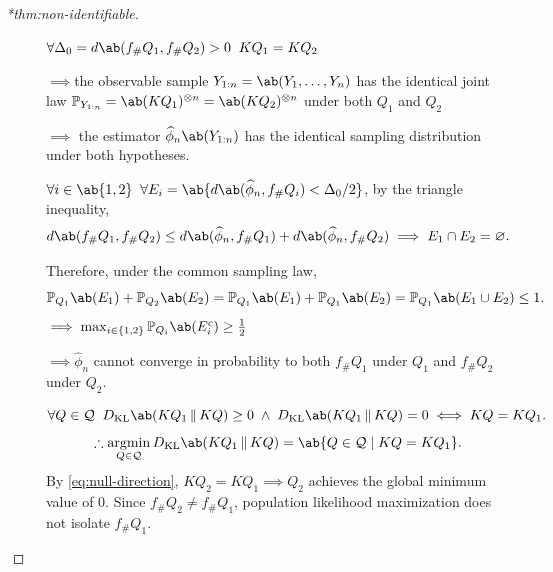 \documentclass[12pt]{article}
\newcommand{\Prb}{\mathbb{P}}
\newcommand{\KL}{D_{\mathrm{KL}}}
\newcommand{\1}{\mathbbm{1}}
\newcommand{\pushf}[1]{#1_{\#}}
\renewcommand{\[}{\begin{equation}}
\renewcommand{\]}{\end{equation}}
\begin{document}
\begin{proof}[*thm:non-identifiable]
        \begin{description}
            \item[] \(\forall \Delta_0 = d \ab( \pushf fQ_1, \pushf fQ_2 ) > 0 \;\; KQ_1 = KQ_2\)
            
            \(\implies\)the observable sample \(Y_{1:n} = \ab(Y_1, \ldots, Y_n)\) has the identical joint law \(\Prb_{Y_{1:n}} = \ab( KQ_1 )^{\otimes n} = \ab( KQ_2 )^{\otimes n}\) under both \(Q_1\) and \(Q_2\)
            
            \(\implies\) the estimator \(\widehat\phi_n \ab(Y_{1:n})\) has the identical sampling distribution under both hypotheses.
                
                \(\forall i \in \ab\{1,2\}\;\; \forall E_i = \ab\{ d \ab( \widehat\phi_n, \pushf fQ_i) < \Delta_0/2 \}\), by the triangle inequality, \[d \ab(\pushf fQ_1, \pushf fQ_2) \le d \ab( \widehat\phi_n, \pushf fQ_1) + d \ab(\widehat\phi_n, \pushf fQ_2) \implies E_1 \cap E_2 = \varnothing.\]
                
                Therefore, under the common sampling law,
                \[
                    \Prb_{Q_1}\ab(E_1) + \Prb_{Q_2}\ab(E_2) = \Prb_{Q_1}\ab(E_1) + \Prb_{Q_1}\ab(E_2) = \Prb_{Q_1}\ab(E_1 \cup E_2) \le 1.
                \]
                \(\implies \max_{i\in\{1,2\}} \Prb_{Q_i} \ab(E_i^c) \ge \frac12\)
                
                \(\implies\widehat\phi_n\) cannot converge in probability to both \(\pushf fQ_1\) under \(Q_1\) and \(\pushf fQ_2\) under \(Q_2\).
            \item[]
                \[
                    \forall Q \in \mathcal{Q}\;\;\KL \ab(KQ_1 \,\|\, KQ) \ge 0\;\land \;\KL \ab(KQ_1 \,\|\, KQ) = 0 \iff KQ = KQ_1.
                \]
                \[
                    \therefore\operatorname*{argmin}_{Q \in \mathcal{Q}} \KL\ab(KQ_1 \,\|\, KQ) = \ab\{Q \in \mathcal{Q} \mid KQ = KQ_1\}.
                \]
                By \cref{eq:null-direction}, \(KQ_2 = KQ_1 \implies Q_2\) achieves the global minimum value of \(0\).
                Since \(\pushf fQ_2 \ne \pushf fQ_1\), population likelihood maximization does not isolate \(\pushf fQ_1\).
        \end{description}
    \end{proof}
\end{document}
